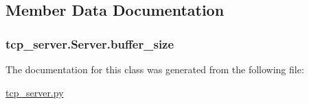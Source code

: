 \subsection{Member Data Documentation}
\hypertarget{classtcp__server_1_1_server_aa0e56b6c0603c767cceb98a5ffda3f2d}{
\subsubsection[{buffer\-\_\-size}]{\setlength{\rightskip}{0pt plus 5cm}tcp\-\_\-server.\-Server.\-buffer\-\_\-size}}\label{classtcp__server_1_1_server_aa0e56b6c0603c767cceb98a5ffda3f2d}


The documentation for this class was generated from the following file\-:\begin{DoxyCompactItemize}
\item 
\hyperlink{tcp__server_8py}{tcp\-\_\-server.\-py}\end{DoxyCompactItemize}
